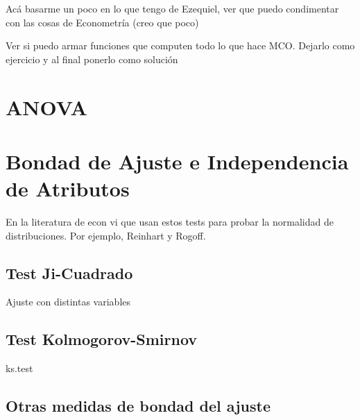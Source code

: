 \documentclass[]{article}
\begin{document}
Acá basarme un poco en lo que tengo de Ezequiel, ver que puedo
condimentar con las cosas de Econometría (creo que poco)

Ver si puedo armar funciones que computen todo lo que hace MCO. Dejarlo
como ejercicio y al final ponerlo como solución

\hypertarget{anova}{%
\section{ANOVA}\label{anova}}

\hypertarget{bondad-de-ajuste-e-independencia-de-atributos}{%
\section{Bondad de Ajuste e Independencia de
Atributos}\label{bondad-de-ajuste-e-independencia-de-atributos}}

En la literatura de econ vi que usan estos tests para probar la
normalidad de distribuciones. Por ejemplo, Reinhart y Rogoff.

\hypertarget{test-ji-cuadrado}{%
\subsection{Test Ji-Cuadrado}\label{test-ji-cuadrado}}

Ajuste con distintas variables

\hypertarget{test-kolmogorov-smirnov}{%
\subsection{Test Kolmogorov-Smirnov}\label{test-kolmogorov-smirnov}}

ks.test

\hypertarget{otras-medidas-de-bondad-del-ajuste}{%
\subsection{Otras medidas de bondad del
ajuste}\label{otras-medidas-de-bondad-del-ajuste}}
\end{document}
